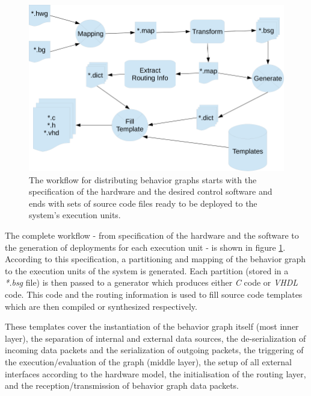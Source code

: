 \documentclass[a4paper,twocolumn]{esapub2005} %
\begin{document}
\begin{figure}[t]
    \centering
    \includegraphics[width=.45\textwidth]{pics/Workflow.png}
    \caption{
        The workflow for distributing behavior graphs starts with the specification of the hardware and the desired control software and
        ends with sets of source code files ready to be deployed to the system's execution units.
    }
    \label{fig:Workflow}
\end{figure}
The complete workflow - from specification of the hardware and the software to the generation of deployments for each execution unit - is shown in figure \ref{fig:Workflow}.
According to this specification, a partitioning and mapping of the behavior graph to the execution units of the system is generated.
Each partition (stored in a \emph{*.bsg} file) is then passed to a generator which produces either \emph{C} code or \emph{VHDL} code.
This code and the routing information is used to fill source code templates which are then compiled or synthesized respectively.

These templates cover the instantiation of the behavior graph itself (most inner layer),
the separation of internal and external data sources,
the de-serialization of incoming data packets and the serialization of outgoing packets,
the triggering of the execution/evaluation of the graph (middle layer),
the setup of all external interfaces according to the hardware model,
the initialisation of the routing layer, and
the reception/transmission of behavior graph data packets.
\end{document}
